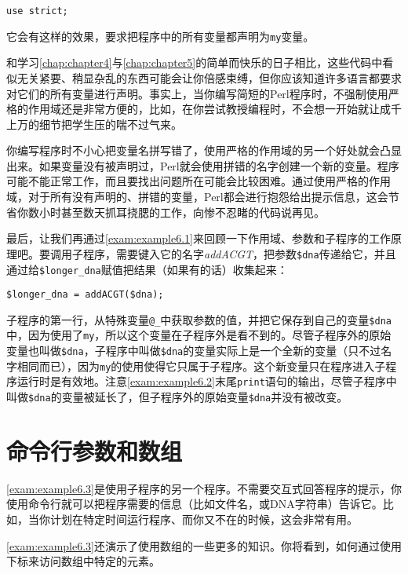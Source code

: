 \begin{lstlisting}
use strict;
\end{lstlisting}

它会有这样的效果，要求把程序中的所有变量都声明为\verb|my|变量。

和学习\autoref{chap:chapter4}与\autoref{chap:chapter5}的简单而快乐的日子相比，这些代码中看似无关紧要、稍显杂乱的东西可能会让你倍感束缚，但你应该知道许多语言都要求对它们的所有变量进行声明。事实上，当你编写简短的Perl程序时，不强制使用严格的作用域还是非常方便的，比如，在你尝试教授编程时，不会想一开始就让成千上万的细节把学生压的喘不过气来。

你编写程序时不小心把变量名拼写错了，使用严格的作用域的另一个好处就会凸显出来。如果变量没有被声明过，Perl就会使用拼错的名字创建一个新的变量。程序可能不能正常工作，而且要找出问题所在可能会比较困难。通过使用严格的作用域，对于所有没有声明的、拼错的变量，Perl都会进行抱怨给出提示信息，这会节省你数小时甚至数天抓耳挠腮的工作，向惨不忍睹的代码说再见。

最后，让我们再通过\autoref{exam:example6.1}来回顾一下作用域、参数和子程序的工作原理吧。要调用子程序，需要键入它的名字\textit{addACGT}，把参数\verb|$dna|传递给它，并且通过给\verb|$longer_dna|赋值把结果（如果有的话）收集起来：

\begin{lstlisting}
$longer_dna = addACGT($dna); 
\end{lstlisting}

子程序的第一行，从特殊变量\verb|@_|中获取参数的值，并把它保存到自己的变量\verb|$dna|中，因为使用了\verb|my|，所以这个变量在子程序外是看不到的。尽管子程序外的原始变量也叫做\verb|$dna|，子程序中叫做\verb|$dna|的变量实际上是一个全新的变量（只不过名字相同而已），因为\verb|my|的使用使得它只属于子程序。这个新变量只在程序进入子程序运行时是有效地。注意\autoref{exam:example6.2}末尾\verb|print|语句的输出，尽管子程序中叫做\verb|$dna|的变量被延长了，但子程序外的原始变量\verb|$dna|并没有被改变。

\section{命令行参数和数组}
\autoref{exam:example6.3}是使用子程序的另一个程序。不需要交互式回答程序的提示，你使用命令行就可以把程序需要的信息（比如文件名，或DNA字符串）告诉它。比如，当你计划在特定时间运行程序、而你又不在的时候，这会非常有用。

\autoref{exam:example6.3}还演示了使用数组的一些更多的知识。你将看到，如何通过使用下标来访问数组中特定的元素。

